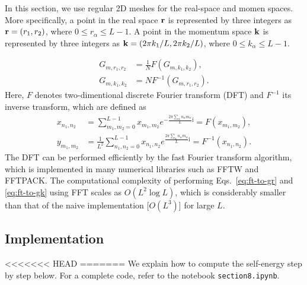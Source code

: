 \documentclass[submission, LectureNotes]{SciPost}
\newcommand{\bk}{\ensuremath{{\bf k}}}
\newcommand{\br}{\ensuremath{{\bf r}}}
\newcommand\ii{\mathrm{i}}%
\begin{document}
In this section, we use regular 2D meshes for the real-space and momen spaces.
More specifically, a point in the real space $\br$ is represented by three integers as
$\br=(r_1, r_2)$, where $0 \le r_\alpha \le L-1$.
A point in the momentum space $\bk$ is represented by three integers as
$\bk=(2\pi k_1/L, 2\pi k_2/L)$, where $0 \le k_\alpha \le L-1$.

\begin{align}
    G_{m,r_1, r_2} &= \frac{1}{N} F(G_{m, k_1, k_2}),\\
    G_{m,k_1, k_2} &= N F^{-1}(G_{m, r_1, r_2}).
\end{align}
Here, $F$ denotes two-dimentional discrete Fourier transform (DFT) and $F^{-1}$ its inverse transform,
which are defined as
\begin{align}
    x_{n_1, n_2} &= \sum_{m_1,m_2=0}^{L-1} x_{m_1,m_2} e^{-\frac{2\pi \sum_\alpha n_\alpha m_\alpha}{L}\ii}= F(x_{m_1, m_2}),\\
    y_{m_1, m_2} &= \frac{1}{L^2} \sum_{n_1,n_2=0}^{L-1} x_{n_1,n_2} e^{\frac{2\pi \sum_\alpha n_\alpha m_\alpha}{L}\ii} = F^{-1}(x_{n_1, n_2}).
\end{align}
The DFT can be performed efficiently by the fast Fourier transform algorithm,
which is implemented in many numerical libraries such as FFTW and FFTPACK.
The computational complexity of performing Eqs.~\eqref{eq:ft-to-gr} and \eqref{eq:ft-to-gk} using FFT
scales as $O(L^2 \log L)$,
which is considerably smaller than that of the naive implementation [$O(L^3)$] for large $L$.

\subsection{Implementation}
<<<<<<< HEAD
=======
We explain how to compute the self-energy step by step below.
For a complete code, refer to the notebook \texttt{section8.ipynb}.
\end{document}
